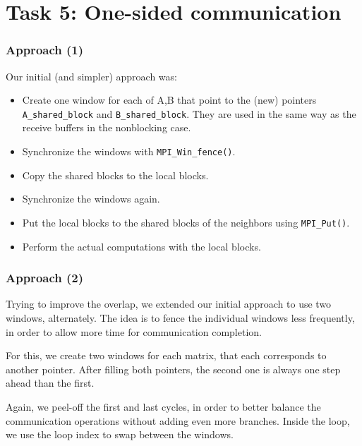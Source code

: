 \documentclass[10pt, compress]{beamer}
\begin{document}
\section{Task 5: One-sided communication}
\begin{frame}
  \frametitle{Approach (1)}
  Our initial (and simpler) approach was:
  \begin{itemize}
  \item Create one window for each of A,B that point to the (new) pointers \texttt{A\_shared\_block} and \texttt{B\_shared\_block}. They are used in the same way as the receive buffers in the nonblocking case.
  \item Synchronize the windows with \texttt{MPI\_Win\_fence()}.
  \item Copy the shared blocks to the local blocks.
  \item Synchronize the windows again.
  \item Put the local blocks to the shared blocks of the neighbors using \texttt{MPI\_Put()}.
  \item Perform the actual computations with the local blocks.
  \end{itemize}
\end{frame}

\begin{frame}
  \frametitle{Approach (2)}
  Trying to improve the overlap, we extended our initial approach to use two windows, alternately. The idea is to fence the individual windows less frequently, in order to allow more time for communication completion.

  For this, we create two windows for each matrix, that each corresponds to another pointer. After filling both pointers, the second one is always one step ahead than the first.
  
  Again, we peel-off the first and last cycles, in order to better balance the communication operations without adding even more branches. Inside the loop, we use the loop index to swap between the windows.
\end{frame}
\end{document}
